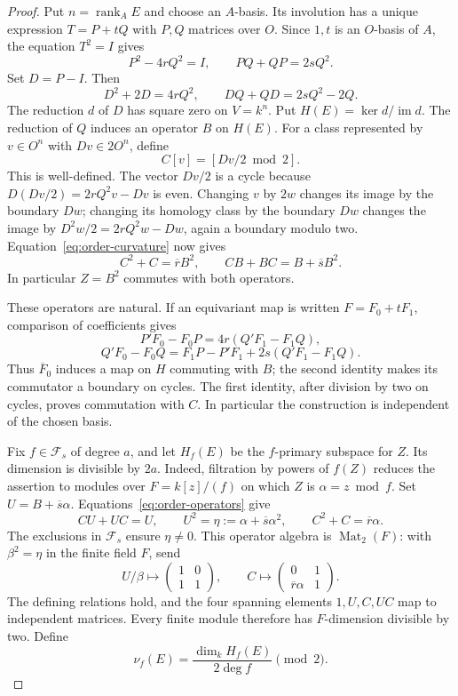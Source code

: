 \begin{proof}
Put $n=\operatorname{rank}_A E$ and choose an $A$-basis.  Its involution has a unique
expression $T=P+tQ$ with $P,Q$ matrices over $O$.  Since $1,t$ is an
$O$-basis of $A$, the equation $T^2=I$ gives
\[
 P^2-4rQ^2=I,\qquad PQ+QP=2sQ^2.
\]
Set $D=P-I$.  Then
\begin{equation}\label{eq:order-curvature}
 D^2+2D=4rQ^2,\qquad DQ+QD=2sQ^2-2Q.
\end{equation}
The reduction $d$ of $D$ has square zero on $V=k^n$.
Put $H(E)=\ker d/\operatorname{im}d$.  The reduction of $Q$ induces an
operator $B$ on $H(E)$.  For a class represented by $v\in O^n$ with
$Dv\in2O^n$, define
\[
 C[v]=[Dv/2\bmod2].
\]
This is well-defined.  The vector $Dv/2$ is a cycle because
$D(Dv/2)=2rQ^2v-Dv$ is even.  Changing $v$ by $2w$ changes its image by
the boundary $Dw$; changing its homology class by the boundary $Dw$
changes the image by $D^2w/2=2rQ^2w-Dw$, again a boundary modulo two.
Equation~\eqref{eq:order-curvature} now gives
\begin{equation}\label{eq:order-operators}
 C^2+C=\overline r B^2,\qquad CB+BC=B+\overline s B^2.
\end{equation}
In particular $Z=B^2$ commutes with both operators.

These operators are natural.  If an equivariant map is written
$F=F_0+tF_1$, comparison of coefficients gives
\[
 P'F_0-F_0P=4r(Q'F_1-F_1Q),
 \]
 \[
 Q'F_0-F_0Q=F_1P-P'F_1+2s(Q'F_1-F_1Q).
\]
Thus $\overline F_0$ induces a map on $H$ commuting with $B$; the second
identity makes its commutator a boundary on cycles.  The first identity,
after division by two on cycles, proves commutation with $C$.
In particular the construction is independent of the chosen basis.

Fix $f\in\mathcal F_s$ of degree $a$, and let $H_f(E)$ be the
$f$-primary subspace for $Z$.  Its dimension is divisible by $2a$.
Indeed, filtration by powers of $f(Z)$ reduces the assertion to
modules over $F=k[z]/(f)$ on which $Z$ is $\alpha=z\bmod f$.
Set $U=B+\overline s\alpha$.  Equations~\eqref{eq:order-operators}
give
\[
 CU+UC=U,\qquad U^2=\eta:=\alpha+\overline s\alpha^2,
 \qquad C^2+C=\overline r\alpha.
\]
The exclusions in $\mathcal F_s$ ensure $\eta\ne0$.
This operator algebra is $\operatorname{Mat}_2(F)$: with
$\beta^2=\eta$ in the finite field $F$, send
\[
 U/\beta\longmapsto\begin{pmatrix}1&0\\1&1\end{pmatrix},\qquad
 C\longmapsto\begin{pmatrix}0&1\\\overline r\alpha&1\end{pmatrix}.
\]
The defining relations hold, and the four spanning elements
$1,U,C,UC$ map to independent matrices.
Every finite module therefore
has $F$-dimension divisible by two.  Define
\begin{equation}\label{eq:order-invariant}
 \nu_f(E)=\frac{\dim_k H_f(E)}{2\deg f}\pmod2.
\end{equation}


\end{proof}
